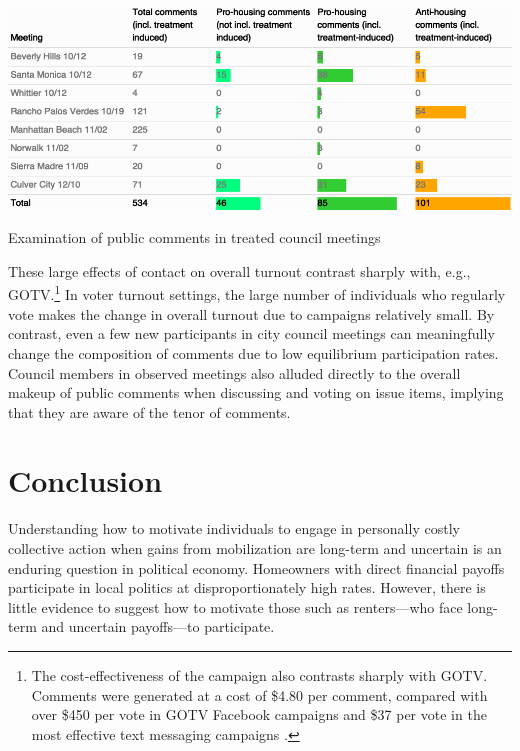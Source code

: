 \documentclass[12pt,final,fleqn]{article}
\theoremstyle{plain}
\begin{document}
\begin{table}[H]
\includegraphics[width = \textwidth]{../tables/tbl1.png}
\caption{Examination of public comments in treated council meetings}
\label{tab: comments_by_meeting}
\end{table}
\vspace{-0.2cm}


These large effects of contact on overall turnout contrast sharply with, e.g., GOTV.\footnote{The cost-effectiveness of the campaign also contrasts sharply with GOTV. Comments were generated at a cost of \$4.80 per comment, compared with over \$450 per vote in GOTV Facebook campaigns and \$37 per vote in the most effective text messaging campaigns \citep{green2019get}.} In voter turnout settings, the large number of individuals who regularly vote makes the change in overall turnout due to campaigns relatively small. By contrast, even a few new participants in city council meetings can meaningfully change the composition of comments due to low equilibrium participation rates. Council members in observed meetings also alluded directly to the overall makeup of public comments when discussing and voting on issue items, implying that they are aware of the tenor of comments. 

\section{Conclusion}

Understanding how to motivate individuals to engage in personally costly collective action when gains from mobilization are long-term and uncertain is an enduring question in political economy. Homeowners with direct financial payoffs participate in local politics at disproportionately high rates. However, there is little evidence to suggest how to motivate those such as renters---who face long-term and uncertain payoffs---to participate.
\end{document}
